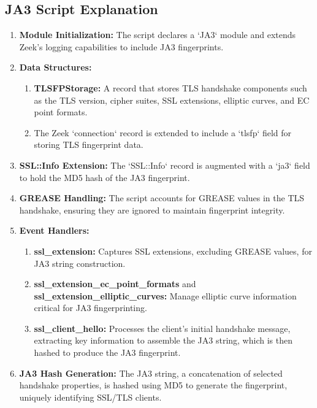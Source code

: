 \subsection{JA3 Script Explanation}
\begin{enumerate}
    \item \textbf{Module Initialization:} The script declares a `JA3` module and extends Zeek's logging capabilities to include JA3 fingerprints.
    
    \item \textbf{Data Structures:}
    \begin{enumerate}
        \item \textbf{TLSFPStorage:} A record that stores TLS handshake components such as the TLS version, cipher suites, SSL extensions, elliptic curves, and EC point formats.
        \item The Zeek `connection` record is extended to include a `tlsfp` field for storing TLS fingerprint data.
    \end{enumerate}
    
    \item \textbf{SSL::Info Extension:} The `SSL::Info` record is augmented with a `ja3` field to hold the MD5 hash of the JA3 fingerprint.
    
    \item \textbf{GREASE Handling:} The script accounts for GREASE values in the TLS handshake, ensuring they are ignored to maintain fingerprint integrity.
    
    \item \textbf{Event Handlers:}
    \begin{enumerate}
        \item \textbf{ssl\_extension:} Captures SSL extensions, excluding GREASE values, for JA3 string construction.
        \item \textbf{ssl\_extension\_ec\_point\_formats} and \textbf{ssl\_extension\_elliptic\_curves:} Manage elliptic curve information critical for JA3 fingerprinting.
        \item \textbf{ssl\_client\_hello:} Processes the client's initial handshake message, extracting key information to assemble the JA3 string, which is then hashed to produce the JA3 fingerprint.
    \end{enumerate}
    
    \item \textbf{JA3 Hash Generation:} The JA3 string, a concatenation of selected handshake properties, is hashed using MD5 to generate the fingerprint, uniquely identifying SSL/TLS clients.
\end{enumerate}


